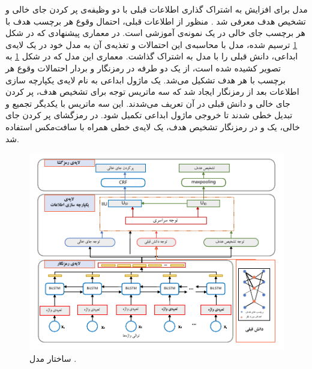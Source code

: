مدل   برای افزایش به اشتراک گذاری اطلاعات قبلی با دو وظیفه‌ی پر کردن جای خالی و تشخیص هدف معرفی شد \cite{priorknowledge}. منظور از اطلاعات قبلی، احتمال وقوع هر برچسب هدف با هر برچسب جای خالی در یک نمونه‌ی آموزشی است. در معماری پیشنهادی  که در شکل \ref{Fig:model_pkjl} ترسیم شده، مدل  با محاسبه‌ی این احتمالات و تغذیه‌ی آن به مدل خود در یک لایه‌ی ابداعی، دانش قبلی را با مدل به اشتراک گذاشت. معماری این مدل که در شکل \ref{Fig:model_pkjl}  به تصویر کشیده شده است، از یک  دو طرفه در رمزنگار و بردار احتمالات وقوع هر برچسب با هر هدف تشکیل می‌شد. یک ماژول ابداعی به نام لایه‌ی یکپارچه سازی اطلاعات بعد از رمزنگار ایجاد شد که سه ماتریس توجه برای تشخیص هدف، پر کردن جای خالی و دانش قبلی در آن تعریف می‌شدند. این سه ماتریس با یکدیگر تجمیع و تبدیل خطی شدند تا خروجی ماژول ابداعی تکمیل شود. در رمزگشای پر کردن جای خالی، یک  و در رمزنگار تشخیص هدف، یک لایه‌ی خطی همراه با سافت‌مکس استفاده شد.
\begin{figure}[!htb]
	\centering
	\includegraphics[scale=2]{Figures/priorknowledge.pdf}
	\caption[ساختار مدل ]{ساختار مدل  \cite{priorknowledge}.}
	\label{Fig:model_pkjl}
\end{figure}
